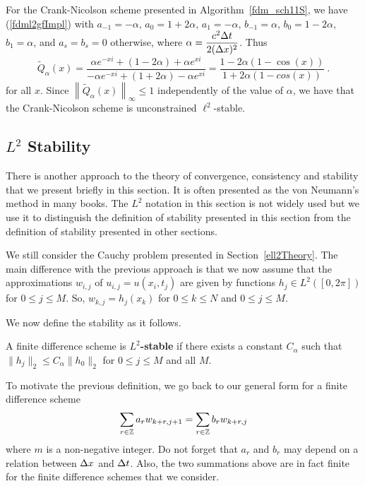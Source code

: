 \begin{egg}
For the Crank-Nicolson scheme presented in
Algorithm~\ref{fdm_sch11S}, we have (\ref{fdml2gfImpl}) with
$a_{-1} = -\alpha$, $a_0 = 1 + 2\alpha$, $a_1 = -\alpha$,
$b_{-1} = \alpha$, $b_0 = 1 - 2\alpha$, $b_1 = \alpha$,
and $a_s = b_s = 0$ otherwise, where
$\displaystyle \alpha = \frac{c^2\Delta{t}}{2 (\Delta{x})^2}$.
Thus
\[
\tilde{Q}_\alpha(x) =
\frac{\alpha e^{-xi} +(1-2\alpha) + \alpha e^{xi}}
{-\alpha e^{-xi} + (1+2\alpha) - \alpha e^{xi}}
= \frac{1 - 2\alpha(1 -\cos(x))}{1+2\alpha(1-cos(x))} \ .
\]
for all $x$.  Since
$\displaystyle \left\|\tilde{Q}_\alpha(x)\right\|_\infty \leq 1$
independently of the value of $\alpha$, we have that the
Crank-Nicolson scheme is unconstrained $\ell^2$-stable.
\label{CNell2StableNo2}
\end{egg}

\subsection{$L^2$ Stability}\label{L2Stab}

There is another approach to the theory of convergence, consistency
and stability that we present briefly in this section.  It is
often presented as the von Neumann's method in many books.  The $L^2$
notation in this section is not widely used but we use it to
distinguish the definition of stability presented in this section from
the definition of stability presented in other sections.

We still consider the Cauchy problem presented in Section~\ref{ell2Theory}.
The main difference with the previous approach is that we now assume
that the approximations $w_{i,j}$ of $u_{i,j} = u(x_i,t_j)$ are given
by functions $h_j \in L^2([0,2\pi])$ for $0 \leq j \leq M$.
So, $\displaystyle w_{k,j} = h_j(x_k)$ for $0 \leq k \leq N$ and
$0\leq j \leq M$.

We now define the stability as it follows.

\begin{defn} \label{fdmStableDefNo3}
A finite difference scheme is {\bfseries $L^2$-stable} if there exists a
constant $C_\alpha$ such that $\|h_j\|_2 \leq C_\alpha \|h_0\|_2$ for
$0 \leq j \leq M$ and all $M$.
\end{defn}

To motivate the previous definition, we go back to our general form
for a finite difference scheme
\begin{equation} \label{fdmgfL2A}
\sum_{r\in \mathbb{Z}} a_r w_{k+r,j+1} =
\sum_{r\in \mathbb{Z}} b_r w_{k+r,j}
\end{equation}
where $m$ is a non-negative integer.  Do not forget that $a_r$ and
$b_r$ may depend on a relation between $\Delta{x}$ and $\Delta{t}$.
Also, the two summations above are in fact finite for the finite
difference schemes that we consider.

